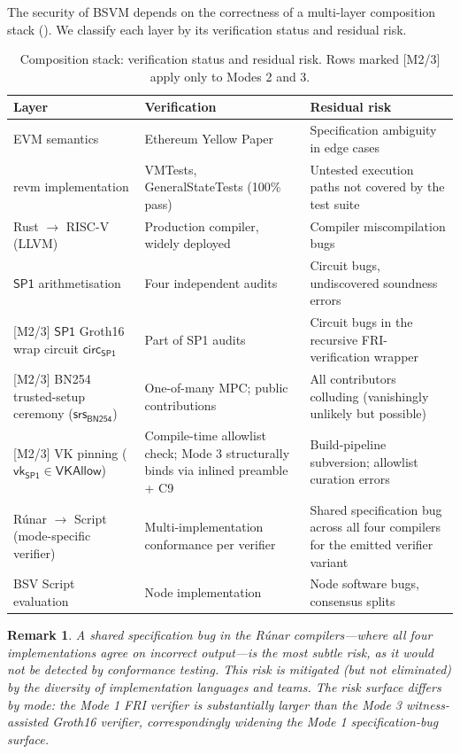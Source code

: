 \documentclass[11pt,a4paper]{article}
\newtheorem{remark}{Remark}[section]
\newcommand{\SPone}{\mathsf{SP1}}
\newcommand{\revm}{\textsf{revm}}
\newcommand{\Runar}{\textsf{R\'{u}nar}}
\newcommand{\SRS}{\mathsf{srs}_{\mathsf{BN254}}}  %
\newcommand{\vkSP}{\mathsf{vk}_{\SPone}}           %
\newcommand{\VKAllow}{\mathsf{VKAllow}}            %
\begin{document}
The security of BSVM depends on the correctness of a multi-layer composition stack (). We classify each layer by its verification status and residual risk.

\begin{table}[h]
\centering
\caption{Composition stack: verification status and residual risk. Rows marked [M2/3] apply only to Modes 2 and 3.}
\label{tab:composition}
\begin{tabular}{@{}l l p{4.5cm}@{}}
\toprule
\textbf{Layer} & \textbf{Verification} & \textbf{Residual risk} \\
\midrule
EVM semantics & Ethereum Yellow Paper & Specification ambiguity in edge cases \\
\addlinespace
\revm{} implementation & VMTests, GeneralStateTests (100\% pass) & Untested execution paths not covered by the test suite \\
\addlinespace
Rust $\to$ RISC-V (LLVM) & Production compiler, widely deployed & Compiler miscompilation bugs \\
\addlinespace
$\SPone$ arithmetisation & Four independent audits & Circuit bugs, undiscovered soundness errors \\
\addlinespace
{[}M2/3{]} $\SPone$ Groth16 wrap circuit $\mathsf{circ}_{\SPone}$ & Part of SP1 audits & Circuit bugs in the recursive FRI-verification wrapper \\
\addlinespace
{[}M2/3{]} BN254 trusted-setup ceremony ($\SRS$) & One-of-many MPC; public contributions & All contributors colluding (vanishingly unlikely but possible) \\
\addlinespace
{[}M2/3{]} VK pinning ($\vkSP \in \VKAllow$) & Compile-time allowlist check; Mode 3 structurally binds via inlined preamble + C9 & Build-pipeline subversion; allowlist curation errors \\
\addlinespace
\Runar{} $\to$ Script (mode-specific verifier) & Multi-implementation conformance per verifier & Shared specification bug across all four compilers for the emitted verifier variant \\
\addlinespace
BSV Script evaluation & Node implementation & Node software bugs, consensus splits \\
\bottomrule
\end{tabular}
\end{table}

\begin{remark}
A shared specification bug in the \Runar{} compilers---where all four implementations agree on incorrect output---is the most subtle risk, as it would not be detected by conformance testing. This risk is mitigated (but not eliminated) by the diversity of implementation languages and teams. The risk surface differs by mode: the Mode 1 FRI verifier is substantially larger than the Mode 3 witness-assisted Groth16 verifier, correspondingly widening the Mode 1 specification-bug surface.
\end{remark}
\end{document}
